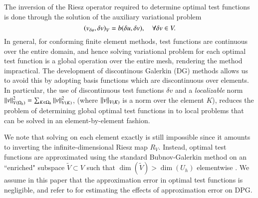 The inversion of the Riesz operator required to determine optimal test functions is done through the solution of the auxiliary variational problem
\begin{equation}
\eqnlab{optvVar}
\left(v_{\delta u},\delta v\right)_V = b({\delta u},\delta v), \quad \forall \delta v \in V.
\end{equation}
In general, for conforming finite element methods, test functions are continuous over the entire domain, and hence solving variational problem  for each optimal test function is a global operation over the entire mesh, rendering the method impractical. The development of discontinous Galerkin (DG) methods allows us to avoid this by adopting basis functions which are discontinuous over elements. In particular, the use of discontinuous test functions $\delta v$ and a \textit{localizable} norm $\nor{v}_{V(\Oh)}^2 = \sum_{K\in\Oh} \nor{v}_{V(K)}^2$, (where $\nor{v}_{V(K)}$ is a norm over the element $K$), reduces the problem of determining global optimal test functions in  to local problems that can be solved in an element-by-element fashion.

We note that solving  on each element exactly is still impossible since it amounts to inverting the infinite-dimensional Riesz map $R_V$. Instead, optimal test functions are approximated using the standard Bubnov-Galerkin method on an ``enriched" subspace $\tilde{V} \subset V$ such that $\dim(\tilde{V}) > \dim(U_h)$ elementwise \cite{DPG1, DPG2}. We assume in this paper that the approximation error in optimal test functions is negligible, and refer to \cite{practicalDPG} for estimating the effects of approximation error on DPG.

